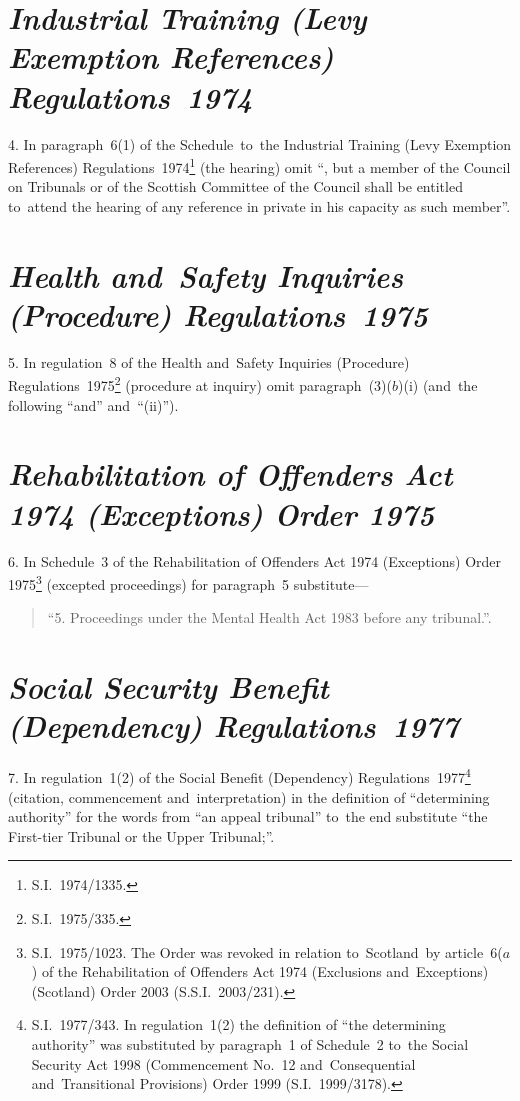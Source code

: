 \documentclass[12pt,a4paper]{article}
\begin{document}
\section*{\itshape Industrial Training (Levy Exemption References) Regulations~1974}

4.  In paragraph~6(1) of the Schedule~to~the Industrial Training (Levy Exemption References) Regulations~1974\footnote{S.I.~1974/1335.} (the hearing) omit “, but a member of the Council on Tribunals or of the Scottish Committee of the Council shall be entitled to~attend the hearing of any reference in private in his capacity as such member”.

\section*{\itshape Health and~Safety Inquiries (Procedure) Regulations~1975}

5.  In regulation~8 of the Health and~Safety Inquiries (Procedure) Regulations~1975\footnote{S.I.~1975/335.} (procedure at inquiry) omit paragraph~(3)($b$)(i)  (and~the following “and” and~“(ii)”).

\section*{\itshape Rehabilitation of Offenders Act 1974 (Exceptions) Order 1975}

6.  In Schedule~3 of the Rehabilitation of Offenders Act 1974 (Exceptions) Order 1975\footnote{S.I.~1975/1023. The Order was revoked in relation to~Scotland~by article~6($a$) of the Rehabilitation of Offenders Act 1974 (Exclusions and~Exceptions) (Scotland) Order 2003 (S.S.I.~2003/231).} (excepted proceedings) for paragraph~5 substitute—
\begin{quotation}
“5.  Proceedings under the Mental Health Act 1983 before any tribunal.”.
\end{quotation}

\section*{\itshape Social Security Benefit (Dependency) Regulations~1977}

7.  In regulation~1(2) of the Social Benefit (Dependency) Regulations~1977\footnote{S.I.~1977/343. In regulation~1(2) the definition of “the determining authority” was substituted by paragraph~1 of Schedule~2 to~the Social Security Act 1998 (Commencement No.~12 and~Consequential and~Transitional Provisions) Order 1999 (S.I.~1999/3178).} (citation, commencement and~interpretation) in the definition of “determining authority” for the words from “an appeal tribunal” to~the end substitute “the First-tier Tribunal or the Upper Tribunal;”.
\end{document}
